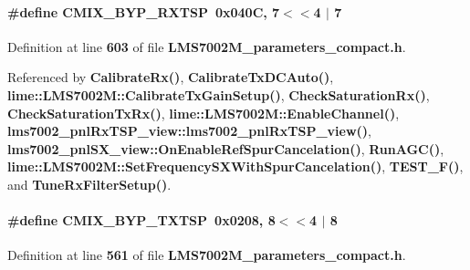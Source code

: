 \paragraph[{C\+M\+I\+X\+\_\+\+B\+Y\+P\+\_\+\+R\+X\+T\+SP}]{\setlength{\rightskip}{0pt plus 5cm}\#define C\+M\+I\+X\+\_\+\+B\+Y\+P\+\_\+\+R\+X\+T\+SP~0x040\+C, 7$<$$<$4 $\vert$  7}\label{LMS7002M__parameters__compact_8h_ac2390fed25b5bfafb132932ef578db02}


Definition at line {\bf 603} of file {\bf L\+M\+S7002\+M\+\_\+parameters\+\_\+compact.\+h}.



Referenced by {\bf Calibrate\+Rx()}, {\bf Calibrate\+Tx\+D\+C\+Auto()}, {\bf lime\+::\+L\+M\+S7002\+M\+::\+Calibrate\+Tx\+Gain\+Setup()}, {\bf Check\+Saturation\+Rx()}, {\bf Check\+Saturation\+Tx\+Rx()}, {\bf lime\+::\+L\+M\+S7002\+M\+::\+Enable\+Channel()}, {\bf lms7002\+\_\+pnl\+Rx\+T\+S\+P\+\_\+view\+::lms7002\+\_\+pnl\+Rx\+T\+S\+P\+\_\+view()}, {\bf lms7002\+\_\+pnl\+S\+X\+\_\+view\+::\+On\+Enable\+Ref\+Spur\+Cancelation()}, {\bf Run\+A\+G\+C()}, {\bf lime\+::\+L\+M\+S7002\+M\+::\+Set\+Frequency\+S\+X\+With\+Spur\+Cancelation()}, {\bf T\+E\+S\+T\+\_\+\+F()}, and {\bf Tune\+Rx\+Filter\+Setup()}.

\paragraph[{C\+M\+I\+X\+\_\+\+B\+Y\+P\+\_\+\+T\+X\+T\+SP}]{\setlength{\rightskip}{0pt plus 5cm}\#define C\+M\+I\+X\+\_\+\+B\+Y\+P\+\_\+\+T\+X\+T\+SP~0x0208, 8$<$$<$4 $\vert$  8}\label{LMS7002M__parameters__compact_8h_a3f9e8ef3a1c2221eee4b664361e1e68a}


Definition at line {\bf 561} of file {\bf L\+M\+S7002\+M\+\_\+parameters\+\_\+compact.\+h}.



